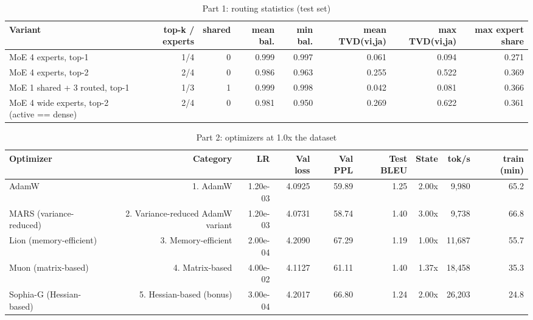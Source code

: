 \begin{table}[htbp]
  \centering
  \caption{Part 1: routing statistics (test set)}
  \label{tab:part1_routing}
  \begin{tabular}{lrrrrrrr}
    \toprule
    Variant & top-k / experts & shared & mean bal. & min bal. & mean TVD(vi,ja) & max TVD(vi,ja) & max expert share \\
    \midrule
    MoE 4 experts, top-1 & 1/4 & 0 & 0.999 & 0.997 & 0.061 & 0.094 & 0.271 \\
    MoE 4 experts, top-2 & 2/4 & 0 & 0.986 & 0.963 & 0.255 & 0.522 & 0.369 \\
    MoE 1 shared + 3 routed, top-1 & 1/3 & 1 & 0.999 & 0.998 & 0.042 & 0.081 & 0.366 \\
    MoE 4 wide experts, top-2 (active == dense) & 2/4 & 0 & 0.981 & 0.950 & 0.269 & 0.622 & 0.361 \\
    \bottomrule
  \end{tabular}
\end{table}

\begin{table}[htbp]
  \centering
  \caption{Part 2: optimizers at 1.0x the dataset}
  \label{tab:part2_main}
  \begin{tabular}{lrrrrrrrr}
    \toprule
    Optimizer & Category & LR & Val loss & Val PPL & Test BLEU & State & tok/s & train (min) \\
    \midrule
    AdamW & 1. AdamW & 1.20e-03 & 4.0925 & 59.89 & 1.25 & 2.00x & 9,980 & 65.2 \\
    MARS (variance-reduced) & 2. Variance-reduced AdamW variant & 1.20e-03 & 4.0731 & 58.74 & 1.40 & 3.00x & 9,738 & 66.8 \\
    Lion (memory-efficient) & 3. Memory-efficient & 2.00e-04 & 4.2090 & 67.29 & 1.19 & 1.00x & 11,687 & 55.7 \\
    Muon (matrix-based) & 4. Matrix-based & 4.00e-02 & 4.1127 & 61.11 & 1.40 & 1.37x & 18,458 & 35.3 \\
    Sophia-G (Hessian-based) & 5. Hessian-based (bonus) & 3.00e-04 & 4.2017 & 66.80 & 1.24 & 2.00x & 26,203 & 24.8 \\
    \bottomrule
  \end{tabular}
\end{table}

